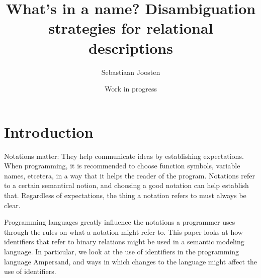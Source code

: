 \documentclass[12pt]{article}
\begin{document}
\title{What's in a name? Disambiguation strategies for relational descriptions}
\author{Sebastiaan Joosten}
\date{Work in progress}
\maketitle

\section{Introduction}



Notations matter: They help communicate ideas by establishing expectations.
When programming, it is recommended to choose function symbols, variable names, etcetera, in a way that it helps the reader of the program.
Notations refer to a certain semantical notion, and choosing a good notation can help establish that.
Regardless of expectations, the thing a notation refers to must always be clear.

Programming languages greatly influence the notations a programmer uses through the rules on what a notation might refer to.
This paper looks at how identifiers that refer to binary relations might be used in a semantic modeling language.
In particular, we look at the use of identifiers in the programming language Ampersand, and ways in which changes to the language might affect the use of identifiers.
\end{document}
